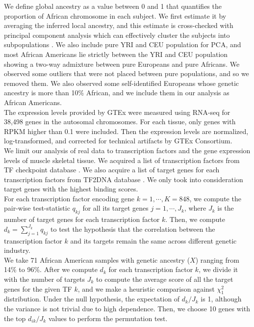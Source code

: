 \documentclass[aap, preprint]{imsart}
\numberwithin{equation}{section}
\theoremstyle{plain}
\begin{document}
We define global ancestry as a value between 0 and 1 that quantifies the proportion of African chromosome in each subject. We first estimate it by averaging the inferred local ancestry, and this estimate is cross-checked with principal component analysis which can effectively cluster the subjects into subpopulations \cite{pritchard2000inference}. We also include pure YRI and CEU population for PCA, and most African Americans lie strictly between the YRI and CEU population showing a two-way admixture between pure Europeans and pure Africans. We observed some outliers that were not placed between pure populations, and so we removed them. We also observed some self-identified Europeans whose genetic ancestry is more than 10\% African, and we include them in our analysis as African Americans. \\

The expression levels provided by GTEx were measured using RNA-seq for 38,498 genes in the autosomal chromosomes. For each tissue, only genes with RPKM higher than 0.1 were included. Then the expression levels are normalized, log-transformed, and corrected for technical artifacts by GTEx Consortium. \\

We limit our analysis of real data to transcription factors and the gene expression levels of muscle skeletal tissue. We acquired a list of transcription factors from TF checkpoint database \cite{chawla2013tfcheckpoint}. We also acquire a list of target genes for each transcription factors from TF2DNA database \cite{pujato2014prediction}. We only took into consideration target genes with the highest binding scores. \\

For each transcription factor encoding gene $k = 1, \cdots, K = 848$, we compute the pair-wise test-statistic $q_{kj}$ for all its target genes $j = 1, \cdots, J_k$, where $J_k$ is the number of target genes for each transcription factor $k$. Then, we compute $d_k = \sum_{j=1}^{J_k} q_{kj}$ to test the hypothesis that the correlation between the transcription factor $k$ and its targets remain the same across different genetic industry. \\

We take 71 African American samples with genetic ancestry ($X$) ranging from 14\% to 96\%. After we compute $d_{k}$ for each transcription factor $k$, we divide it with the number of targets $J_k$ to compute the average score of all the target genes for the given TF $k$, and we make a heuristic comparison against $\chi_1^2$ distribution. Under the null hypothesis, the expectation of $d_k/J_k$ is 1, although the variance is not trivial due to high dependence. Then, we choose 10 genes with the top $d_{ik}/J_k$ values to perform the permutation test. \\
\end{document}
